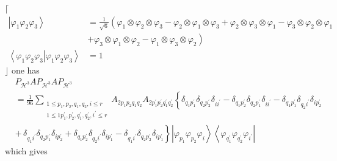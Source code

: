 \documentclass[aps,preprint]{revtex4}%
\begin{document}
$\lceil$%
\begin{align}
\left\vert \varphi_{1}\varphi_{2}\varphi_{3}\right\rangle  &  =\frac{1}%
{\sqrt{6}}\left(  \varphi_{1}\otimes\varphi_{2}\otimes\varphi_{3}-\varphi
_{2}\otimes\varphi_{1}\otimes\varphi_{3}+\varphi_{2}\otimes\varphi_{3}%
\otimes\varphi_{1}-\varphi_{3}\otimes\varphi_{2}\otimes\varphi_{1}\right. \\
&  +\left.  \varphi_{3}\otimes\varphi_{1}\otimes\varphi_{2}-\varphi_{1}%
\otimes\varphi_{3}\otimes\varphi_{2}\right) \\
\left\langle \varphi_{1}\varphi_{2}\varphi_{3}\left\vert \varphi_{1}%
\varphi_{2}\varphi_{3}\right.  \right\rangle  &  =1
\end{align}
$\rfloor$ one has%
\begin{align}
&  P_{\mathcal{H}^{3}}AP_{\mathcal{H}^{3}}AP_{\mathcal{H}^{3}}\nonumber\\
&  \left.  =\right.  \frac{1}{96}\sum_{\substack{1\leq p_{1},p_{2},q_{1}%
,q_{2},i\leq r\\1\leq1p_{1}^{\prime},p_{2}^{\prime},q_{1}^{\prime}%
,q_{2}^{\prime},i^{\prime}\leq r}}A_{2p_{1}p_{2}q_{1}q_{2}}A_{2p_{1}^{\prime
}p_{2}^{\prime}q_{1}^{\prime}q_{2}^{\prime}}\left\{  \delta_{q_{1}%
p_{1}^{\prime}}\delta_{q_{2}p_{2}^{\prime}}\delta_{ii^{\prime}}-\delta
_{q_{1}p_{2}^{\prime}}\delta_{q_{2}p_{1}^{\prime}}\delta_{ii^{\prime}}%
-\delta_{q_{1}p_{1}^{\prime}}\delta_{q_{2}i^{\prime}}\delta_{ip_{2}^{\prime}%
}\right. \nonumber\\
&  \left.  +\,\delta_{q_{1}i^{\prime}}\delta_{q_{2}p_{1}^{\prime}}%
\delta_{ip_{2}^{\prime}}+\delta_{q_{1}p_{2}^{\prime}}\delta_{q_{2}i^{\prime}%
}\delta_{ip_{1}^{\prime}}-\delta_{q_{1}i^{\prime}}\delta_{q_{2}p_{2}^{\prime}%
}\delta_{ip_{1}^{\prime}}\right\}  \left\vert \varphi_{p_{1}}\varphi_{p_{2}%
}\varphi_{i}\right\rangle \left\langle \varphi_{q_{1}^{\prime}}\varphi
_{q_{2}^{\prime}}\varphi_{i^{\prime}}\right\vert
\end{align}
which gives%
\end{document}
